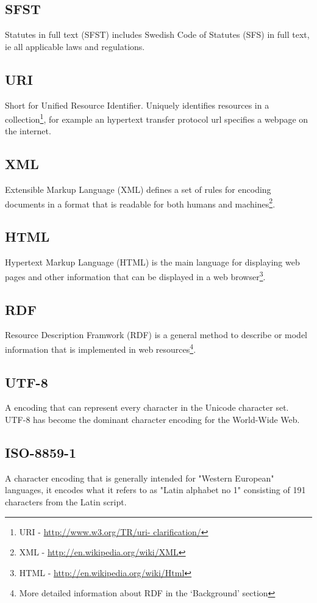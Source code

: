 \subsection*{SFST}
Statutes in full text (SFST) includes Swedish Code of Statutes (SFS) in
full text, ie all applicable laws and regulations.

\subsection*{URI} Short for Unified Resource Identifier. Uniquely identifies
resources in a collection\footnote{URI - \url{http://www.w3.org/TR/uri-
clarification/}}, for example an hypertext transfer protocol url specifies a
webpage on the internet.

\subsection*{XML} Extensible Markup Language (XML) defines a set of rules for
encoding documents in a format that is readable for both humans and
machines\footnote{XML - \url{http://en.wikipedia.org/wiki/XML}}.

\subsection*{HTML} Hypertext Markup Language (HTML) is the main language for
displaying web pages and other information that can be displayed in a web
browser\footnote{HTML - \url{http://en.wikipedia.org/wiki/Html}}.

\subsection*{RDF} Resource Description Framwork (RDF) is a general method to
describe or model information that is implemented in web
resources\footnote{More detailed information about RDF in the ‘Background’
section}.

\subsection*{UTF-8} A encoding that can represent every character in the
Unicode character set. UTF-8 has become the dominant character encoding for
the World-Wide Web.

\subsection*{ISO-8859-1} A character encoding that is generally intended for
"Western European" languages, it encodes what it refers to as "Latin alphabet
no 1" consisting of 191 characters from the Latin script.

